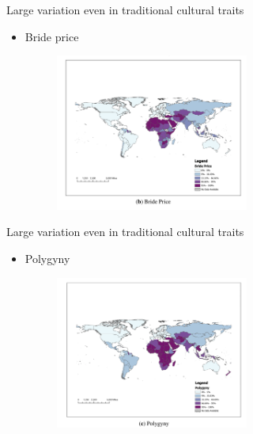 \documentclass[11pt,notes=hide,aspectratio=169,mathserif]{beamer}
\begin{document}
\begin{frame}{Large variation even in traditional cultural traits}
\begin{itemize}
  \item Bride price
  \begin{figure}
    \centering
    \includegraphics[width=0.6\textwidth]{brideprice.png}
  \end{figure}
\end{itemize}
\end{frame}

\begin{frame}{Large variation even in traditional cultural traits}
\begin{itemize}
  \item Polygyny
  \begin{figure}
    \centering
    \includegraphics[width=0.6\textwidth]{polygyny.png}
  \end{figure}
\end{itemize}
\end{frame}
\end{document}
